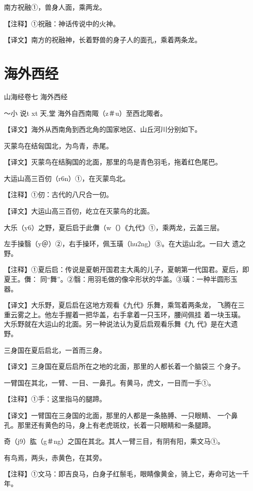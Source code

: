 \documentclass[a4paper,12pt,UTF8,twoside]{ctexbook}
\begin{document}
南方祝融①，兽身人面，乘两龙。

【注释】①祝融：神话传说中的火神。

【译文】南方的祝融神，长着野兽的身子人的面孔，乘着两条龙。

\chapter{海外西经}

山海经卷七 海外西经

～小  说t  xt 天,堂
海外自西南陬（z＃u）至西北陬者。

【译文】海外从西南角到西北角的国家地区、山丘河川分别如下。

灭蒙鸟在结匈国北，为鸟青，赤尾。

【译文】灭蒙鸟在结胸国的北面，那里的鸟是青色羽毛，拖着红色尾巴。

大运山高三百仞（r6n）①，在灭蒙鸟北。

【注释】①仞：古代的八尺合一仞。

【译文】大运山高三百仞，屹立在灭蒙鸟的北面。

大乐（y6）之野，夏后启于此儛（w（）《九代》①，乘两龙，云盖三层。

左手操翳（y＠）②，右手操环，佩玉璜（hu2ng）③。在大运山北。一曰大 遗之野。

【注释】①夏后启：传说是夏朝开国君主大禹的儿子，夏朝第一代国君。夏后，即夏王。儛： 同“舞”。②翳：用羽毛做的像伞形状的华盖。③璜：一种半圆形玉器。

【译文】大乐野，夏后启在这地方观看《九代》乐舞，乘驾着两条龙， 飞腾在三重云雾之上。他左手握着一把华盖，右手拿着一只玉环，腰间佩挂 着一块玉璜。大乐野就在大运山的北面。另一种说法认为夏后启观看乐舞《九 代》是在大遗野。

三身国在夏后启北，一首而三身。

【译文】三身国在夏后启所在之地的北面，那里的人都长着一个脑袋三 个身子。

一臂国在其北，一臂、一目、一鼻孔。有黄马，虎文，一目而一手①。

【注释】①手：这里指马的腿蹄。

【译文】一臂国在三身国的北面，那里的人都是一条胳膊、一只眼睛、 一个鼻孔。那里还有黄色的马，身上有老虎斑纹，长着一只眼睛和一条腿蹄。

奇（j9）肱（g＃ng）之国在其北。其人一臂三目，有阴有阳，乘文马①。

有鸟焉，两头，赤黄色，在其旁。

【注释】①文马：即吉良马，白身子红鬃毛，眼睛像黄金，骑上它，寿命可达一千年。
\end{document}
